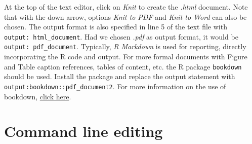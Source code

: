\documentclass[
]{book}
\newenvironment{Shaded}{\begin{snugshade}}{\end{snugshade}}
\newcommand{\NormalTok}[1]{#1}
\begin{document}
\begin{Shaded}
\end{Shaded}

At the top of the text editor, click on \emph{Knit} to create the \emph{{.html}} document. Note that with the down arrow, options \emph{Knit to PDF} and \emph{Knit to Word} can also be chosen. The output format is also specified in line 5 of the text file with \texttt{output:\ html\_document}. Had we chosen \emph{{.pdf}} as output format, it would be \texttt{output:\ pdf\_document}. Typically, \emph{{R Markdown}} is used for reporting, directly incorporating the R code and output. For more formal documents with Figure and Table caption references, tables of content, etc. the R package \texttt{bookdown} should be used. Install the package and replace the output statement with \texttt{output:bookdown::pdf\_document2}. For more information on the use of bookdown, \href{https://bookdown.org/}{click here}.

\section{Command line editing}\label{command-line-editing}
\end{document}
